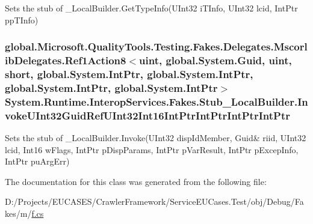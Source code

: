 Sets the stub of \-\_\-\-Local\-Builder.\-Get\-Type\-Info(\-U\-Int32 i\-T\-Info, U\-Int32 lcid, Int\-Ptr pp\-T\-Info)

\hypertarget{class_system_1_1_runtime_1_1_interop_services_1_1_fakes_1_1_stub___local_builder_a541df4a8557963c627609269a1b1fdaf}{
\subsubsection[{Invoke\-U\-Int32\-Guid\-Ref\-U\-Int32\-Int16\-Int\-Ptr\-Int\-Ptr\-Int\-Ptr\-Int\-Ptr}]{\setlength{\rightskip}{0pt plus 5cm}global.\-Microsoft.\-Quality\-Tools.\-Testing.\-Fakes.\-Delegates.\-Mscorlib\-Delegates.\-Ref1\-Action8$<$uint, global.\-System.\-Guid, uint, short, global.\-System.\-Int\-Ptr, global.\-System.\-Int\-Ptr, global.\-System.\-Int\-Ptr, global.\-System.\-Int\-Ptr$>$ System.\-Runtime.\-Interop\-Services.\-Fakes.\-Stub\-\_\-\-Local\-Builder.\-Invoke\-U\-Int32\-Guid\-Ref\-U\-Int32\-Int16\-Int\-Ptr\-Int\-Ptr\-Int\-Ptr\-Int\-Ptr}}\label{class_system_1_1_runtime_1_1_interop_services_1_1_fakes_1_1_stub___local_builder_a541df4a8557963c627609269a1b1fdaf}


Sets the stub of \-\_\-\-Local\-Builder.\-Invoke(U\-Int32 disp\-Id\-Member, Guid\& riid, U\-Int32 lcid, Int16 w\-Flags, Int\-Ptr p\-Disp\-Params, Int\-Ptr p\-Var\-Result, Int\-Ptr p\-Excep\-Info, Int\-Ptr pu\-Arg\-Err)



The documentation for this class was generated from the following file\-:\begin{DoxyCompactItemize}
\item 
D\-:/\-Projects/\-E\-U\-C\-A\-S\-E\-S/\-Crawler\-Framework/\-Service\-E\-U\-Cases.\-Test/obj/\-Debug/\-Fakes/m/\hyperlink{m_2f_8cs}{f.\-cs}\end{DoxyCompactItemize}
